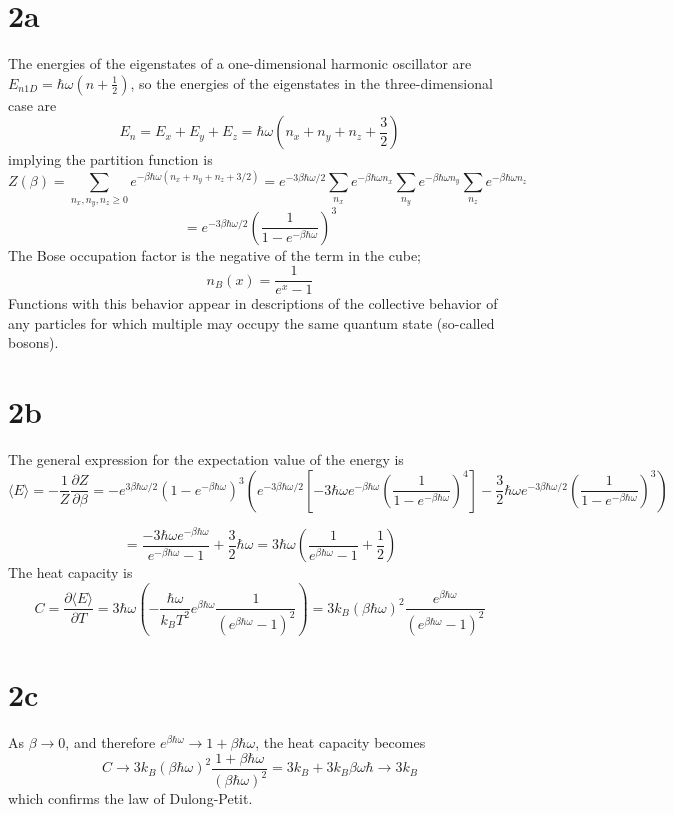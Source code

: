 \documentclass{article}
\begin{document}
\section*{2a}
The energies of the eigenstates of a one-dimensional harmonic oscillator are $E_{n1D}=\hbar\omega(n+\frac{1}{2})$, so the energies of the eigenstates in the three-dimensional case are
\[E_n=E_x+E_y+E_z=\hbar\omega\left(n_x+n_y+n_z+\frac{3}{2}\right)\]
implying the partition function is
\[Z(\beta)=\sum_{n_{x},n_{y},n_{z}\geq 0}e^{-\beta\hbar\omega\left( n_x+n_y+n_z+3/2 \right)}=e^{-3\beta\hbar\omega/2}\sum_{n_{x}}e^{-\beta\hbar\omega n_{x}}\sum_{n_{y}}e^{-\beta\hbar\omega n_{y}}\sum_{n_{z}}e^{-\beta\hbar\omega n_{z}}\]
\[=e^{-3\beta\hbar\omega/2}\left( \frac{1}{1-e^{-\beta\hbar\omega}} \right)^{3}\]
The Bose occupation factor is the negative of the term in the cube;
\[n_{B}(x)=\frac{1}{e^{x}-1}\]
Functions with this behavior appear in descriptions of the collective behavior of any particles for which multiple may occupy the same quantum state (so-called bosons).

\section*{2b}
The general expression for the expectation value of the energy is
\[\langle E \rangle=-\frac{1}{Z}\frac{\partial Z}{\partial\beta}=-e^{3\beta\hbar\omega/2}\left( 1-e^{-\beta\hbar\omega} \right)^{3}\left( e^{-3\beta\hbar\omega/2}\left[ -3\hbar\omega e^{-\beta\hbar\omega}\left( \frac{1}{1-e^{-\beta\hbar\omega}} \right)^{4} \right]-\frac{3}{2}\hbar\omega e^{-3\beta\hbar\omega/2}\left( \frac{1}{1-e^{-\beta\hbar\omega}} \right)^{3} \right)\]

\[=\frac{-3\hbar\omega e^{-\beta\hbar\omega}}{e^{-\beta\hbar\omega}-1}+\frac{3}{2}\hbar\omega=3\hbar\omega\left( \frac{1}{e^{\beta\hbar\omega}-1}+\frac{1}{2} \right)\]
The heat capacity is
\[C=\frac{\partial\langle E \rangle}{\partial T}=3\hbar\omega\left( -\frac{\hbar\omega}{k_{B}T^{2}}e^{\beta\hbar\omega}\frac{1}{(e^{\beta\hbar\omega}-1)^{2}} \right)=3k_{B}\left( \beta\hbar\omega \right)^{2}\frac{e^{\beta\hbar\omega}}{(e^{\beta\hbar\omega}-1)^{2}}\]

\section*{2c}
As $\beta\to 0$, and therefore $e^{\beta\hbar\omega}\to 1+\beta\hbar\omega$, the heat capacity becomes
\[C\to 3k_{B}(\beta\hbar\omega)^{2}\frac{1+\beta\hbar\omega}{(\beta\hbar\omega)^{2}}=3k_{B}+3k_{B}\beta\omega\hbar\to 3k_{B}\]
which confirms the law of Dulong-Petit.
\end{document}
